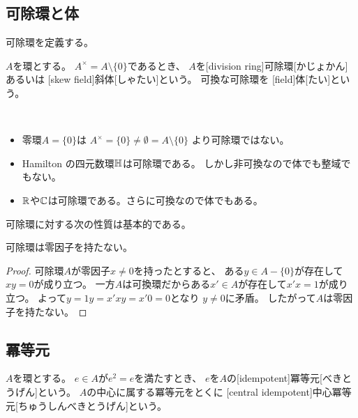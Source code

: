 \documentclass[report]{jlreq}
\begin{document}
\subsection{可除環と体}

可除環を定義する。

\begin{definition}[乗法群]
    \TODO{}
\end{definition}

\begin{definition}[可除環]
    $A$を環とする。
    $A^\times = A \setminus \{0\}$であるとき、
    $A$を[division ring]{可除環}[かじょかん]あるいは
    [skew field]{斜体}[しゃたい]という。
    可換な可除環を
    [field]{体}[たい]という。
\end{definition}

\begin{example}[可除環の例]
    ~
    \begin{itemize}
        \item 零環$A = \{ 0 \}$は
            $A^\times = \{ 0 \} \neq \emptyset = A \setminus \{ 0 \}$
            より可除環ではない。
        \item Hamilton の四元数環$\mathbb{H}$は可除環である。
            しかし非可換なので体でも整域でもない。
        \item $\mathbb{R}$や$\mathbb{C}$は可除環である。さらに可換なので体でもある。
    \end{itemize}
\end{example}

可除環に対する次の性質は基本的である。

\begin{proposition}
    可除環は零因子を持たない。
\end{proposition}

\begin{proof}
    可除環$A$が零因子$x \neq 0$を持ったとすると、
    ある$y \in A - \{ 0 \}$が存在して$xy = 0$が成り立つ。
    一方$A$は可換環だからある$x' \in A$が存在して$x'x = 1$が成り立つ。
    よって$y = 1y = x'xy = x'0 = 0$となり
    $y \neq 0$に矛盾。
    したがって$A$は零因子を持たない。
\end{proof}

\subsection{冪等元}

\begin{definition}[冪等元]
    $A$を環とする。
    $e \in A$が$e^2 = e$を満たすとき、
    $e$を$A$の[idempotent]{冪等元}[べきとうげん]という。
    $A$の中心に属する冪等元をとくに
    [central idempotent]{中心冪等元}[ちゅうしんべきとうげん]という。
\end{definition}
\end{document}
